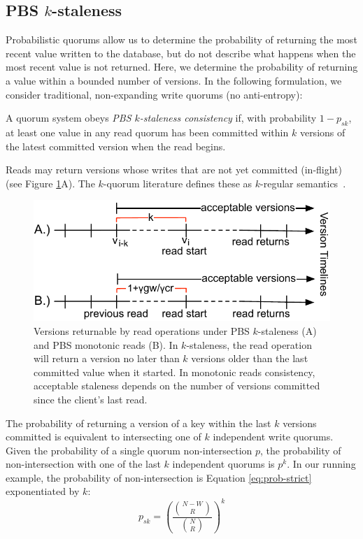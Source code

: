 \documentclass{vldb}
\newcommand{\subsectionskip}{-0em}
\begin{document}
\vspace{\subsectionskip}\subsection{PBS $k$-staleness}
\label{sec:kstale}

Probabilistic quorums allow us to determine the probability of
returning the most recent value written to the database, but do not
describe what happens when the most recent value is not returned.
Here, we determine the probability of returning a value within a
bounded number of versions.  In the following formulation, we consider
traditional, non-expanding write quorums (no anti-entropy):
\begin{definition}
A quorum system obeys \textit{PBS $k$-staleness consistency} if, with
probability $1-p_{sk}$, at least one value in any read quorum has been
committed within $k$ versions of the latest committed version when the
read begins.
\end{definition}
Reads may return versions whose writes that are not yet committed
(in-flight) (see Figure \ref{fig:timelines}A).  The $k$-quorum
literature defines these as $k$-regular semantics~\cite{non-strict}.

\begin{figure}
\centering
\includegraphics[width=.95\columnwidth]{figs/timelines.pdf}
\vspace{-8pt}
\caption{Versions returnable by read operations under PBS
  $k$-staleness (A) and PBS monotonic reads (B). In $k$-staleness, the
  read operation will return a version no later than $k$ versions
  older than the last committed value when it started.  In monotonic
  reads consistency, acceptable staleness depends on the number of
  versions committed since the client's last read.}
\vspace{-12pt}
\label{fig:timelines}
\end{figure}

The probability of returning a version of a key within the last $k$
versions committed is equivalent to intersecting one of $k$
independent write quorums.  Given the probability of a single quorum
non-intersection $p$, the probability of non-intersection with one of
the last $k$ independent quorums is $p^k$.  In our running example, the probability of non-intersection is Equation
\ref{eq:prob-strict} exponentiated by $k$:
\begin{equation}
\label{eq:k-consistency}
p_{sk} = \left(\frac{{N-W \choose R}}{{N \choose R}}\right)^k
\end{equation}
\end{document}
